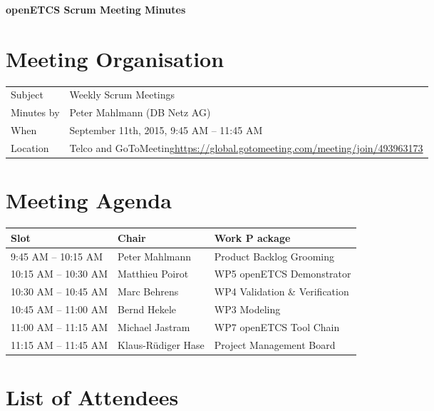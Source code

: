 \documentclass[a4paper, 11pt]{article}
\begin{document}
{\begin{center}\huge\bf openETCS Scrum Meeting Minutes\end{center}}

\section{Meeting Organisation}

\renewcommand{\arraystretch}{1.5}
\begin{supertabular}{m{.2\textwidth}m{.8\textwidth}}
Subject & Weekly Scrum Meetings\\
Minutes by & Peter Mahlmann (DB Netz AG)\\
When & September 11th, 2015, 9:45 AM -- 11:45 AM\\
Location & Telco and GoToMeeting\newline \url{https://global.gotomeeting.com/meeting/join/493963173}\\
\end{supertabular}

\renewcommand{\arraystretch}{1.0}
\section{Meeting Agenda}

\begin{tabular}{lll}
\toprule
\textbf{Slot} &  \textbf{Chair} & \textbf{Work P ackage} \\
\midrule 
9:45 AM -- 10:15 AM & Peter Mahlmann & Product Backlog Grooming  \\
10:15 AM -- 10:30 AM & Matthieu Poirot & WP5 openETCS Demonstrator \\  
10:30 AM -- 10:45 AM & Marc Behrens & WP4 Validation \& Verification \\
10:45 AM -- 11:00 AM & Bernd Hekele & WP3 Modeling \\
11:00 AM -- 11:15 AM & Michael Jastram  & WP7 openETCS Tool Chain \\
11:15 AM -- 11:45 AM & Klaus-R\"udiger Hase & Project Management Board \\
\bottomrule
\end{tabular}

\section{List of Attendees}
\end{document}
